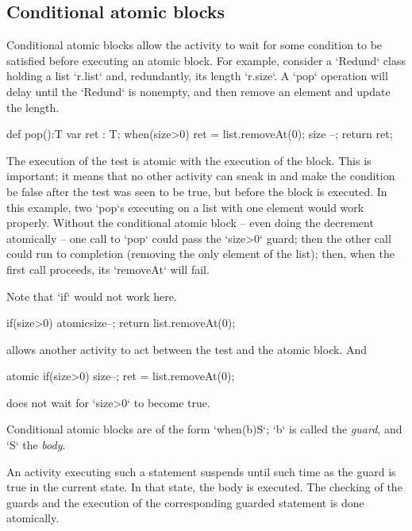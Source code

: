 \subsection{Conditional atomic blocks}



Conditional atomic blocks allow the activity to wait for some condition to be
satisfied before executing an atomic block. For example, consider a
\xcd`Redund` class holding a list \xcd`r.list` and, redundantly, its length
\xcd`r.size`.  A \xcd`pop` operation will delay until the \xcd`Redund` is
nonempty, and then remove an element and update the length.  
\begin{xten}
def pop():T {
  var ret : T;
  when(size>0) {
    ret = list.removeAt(0);
    size --;
    }
  return ret;
}
\end{xten}


The execution of the test is atomic with the execution of the block.  This is
important; it means that no other activity can sneak in and make the condition
be false after the test was seen to be true, but 
before the block is executed.  In this example, two \xcd`pop`s
executing on a list with one element would work properly. Without the
conditional atomic block -- even doing the decrement atomically -- one call to
\xcd`pop` could pass the \xcd`size>0` guard; then the other call could run to
completion (removing the only element of the list); then, when the first call
proceeds, its \xcd`removeAt` will fail.  

Note that \xcd`if` would not work here.  
\begin{xtenmath}
if(size>0) atomic{size--; return list.removeAt(0);}
\end{xtenmath} 
allows another
activity to act between the test and the atomic block.  
And 
\begin{xtenmath}
atomic{ if(size>0) {size--; ret = list.removeAt(0);}}
\end{xtenmath}
does not wait for \xcd`size>0` to become true.


Conditional atomic blocks are of the form \xcd`when(b)S`; 
\xcd`b` is called the {\em guard}, and \xcd`S` the {\em body}.

An activity executing such a statement suspends until such time as the  guard
is true in the current state. In that state, the 
body is executed. 
The checking of the guards and the execution of the corresponding
guarded statement is done atomically. 

